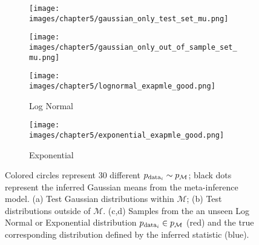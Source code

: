 \begin{figure}
\centering     %
\begin{subfigure}[b]{0.49\linewidth}
    \texttt{[image: images/chapter5/gaussian\_only\_test\_set\_mu.png]}
\end{subfigure}
\begin{subfigure}[b]{0.49\linewidth}
    \texttt{[image: images/chapter5/gaussian\_only\_out\_of\_sample\_set\_mu.png]}
\end{subfigure}
\begin{subfigure}[b]{0.49\linewidth}
    \texttt{[image: images/chapter5/lognormal\_exapmle\_good.png]}
    \caption{Log Normal}
\end{subfigure}
\begin{subfigure}[b]{0.49\linewidth}
    \texttt{[image: images/chapter5/exponential\_exapmle\_good.png]}
    \caption{Exponential}
\end{subfigure}
\caption{Colored circles represent 30 different $p_{\textup{data}_i} \sim p_{\mathcal{M}}$; black dots represent the inferred Gaussian means from the meta-inference model. (a) Test Gaussian distributions within $\mathcal{M}$; (b) Test distributions outside of $\mathcal{M}$. (c,d) Samples from the an unseen Log Normal or Exponential distribution $p_{\textup{data}_i} \in p_{\mathcal{M}}$ (red) and the true corresponding distribution defined by the inferred statistic (blue).}
\label{fig:gaussian_plot}
\end{figure}

